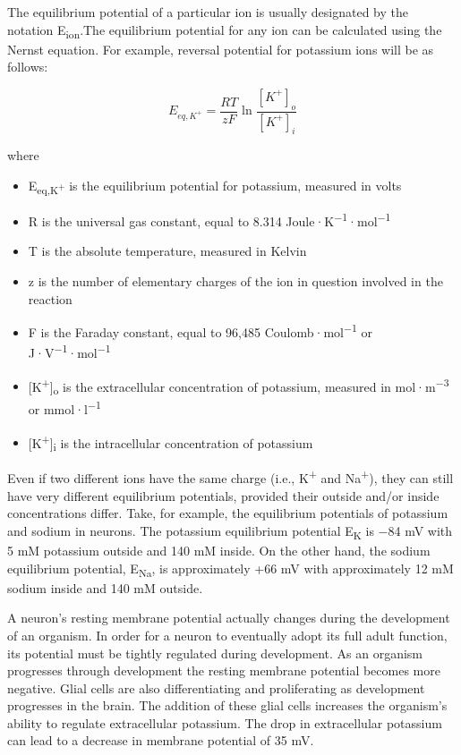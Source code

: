 The equilibrium potential of a particular ion is usually designated by the notation E\textsubscript{ion}.The equilibrium potential for any ion can be calculated using the Nernst equation. For example, reversal potential for potassium ions will be as follows:

\[  E_{eq,K^+} = \frac{RT}{zF} \ln \frac{[K^+]_{o}}{[K^+]_{i}} \]

where

\begin{itemize}
\tightlist
\item
  E\textsubscript{eq,K\textsuperscript{+}} is the equilibrium potential for potassium, measured in volts
\item
  R is the universal gas constant, equal to 8.314 Joule·K\textsuperscript{−1}·mol\textsuperscript{−1}
\item
  T is the absolute temperature, measured in Kelvin
\item
  z is the number of elementary charges of the ion in question involved in the reaction
\item
  F is the Faraday constant, equal to 96,485 Coulomb·mol\textsuperscript{−1} or J·V\textsuperscript{−1}·mol\textsuperscript{−1}
\item
  {[}K\textsuperscript{+}{]}\textsubscript{o} is the extracellular concentration of potassium, measured in mol·m\textsuperscript{−3} or mmol·l\textsuperscript{−1}
\item
  {[}K\textsuperscript{+}{]}\textsubscript{i} is the intracellular concentration of potassium
\end{itemize}

Even if two different ions have the same charge (i.e., K\textsuperscript{+} and Na\textsuperscript{+}), they can still have very different equilibrium potentials, provided their outside and/or inside concentrations differ. Take, for example, the equilibrium potentials of potassium and sodium in neurons. The potassium equilibrium potential E\textsubscript{K} is −84 mV with 5 mM potassium outside and 140 mM inside. On the other hand, the sodium equilibrium potential, E\textsubscript{Na}, is approximately +66 mV with approximately 12 mM sodium inside and 140 mM outside.

A neuron's resting membrane potential actually changes during the development of an organism. In order for a neuron to eventually adopt its full adult function, its potential must be tightly regulated during development. As an organism progresses through development the resting membrane potential becomes more negative. Glial cells are also differentiating and proliferating as development progresses in the brain. The addition of these glial cells increases the organism's ability to regulate extracellular potassium. The drop in extracellular potassium can lead to a decrease in membrane potential of 35 mV.

